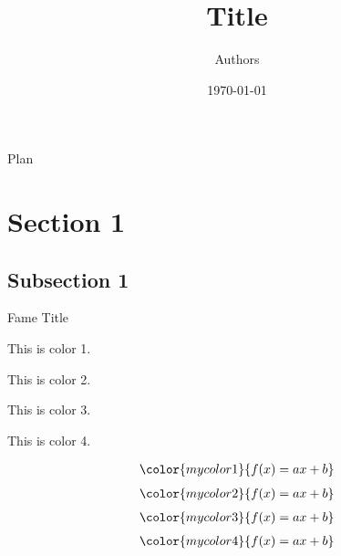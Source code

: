 \documentclass[svgnames, 12pt, aspectratio=43]{beamer}
\title[Short Title]{Title}
\author{Authors}
\date{\today}
\begin{document}
\begin{frame}
  \titlepage
\end{frame}

\begin{frame}{Plan}
  \tableofcontents
\end{frame}

\section{Section 1}

\subsection{Subsection 1}

\begin{frame}{Fame Title}

\textcolor{mycolor1}{This is color 1.}

\textcolor{mycolor2}{This is color 2.}

\textcolor{mycolor3}{This is color 3.}

\textcolor{mycolor4}{This is color 4.}



\begin{align}
\color{mycolor1}{f(x) = ax + b}
\end{align}
\begin{align}
\color{mycolor2}{ f(x) = ax + b}
\end{align} 
\begin{align}
\color{mycolor3}{ f(x) = ax + b}
\end{align}
\begin{align}
\color{mycolor4}{ f(x) = ax + b}
\end{align}

\end{frame}
\end{document}
